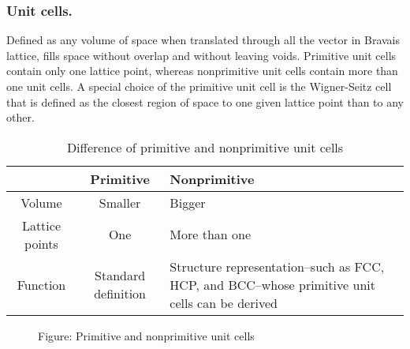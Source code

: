 \documentclass[../../../main.tex]{subfiles}
\begin{document}
\subsubsection{Unit cells.}
Defined as any volume of space when translated through all the vector in Bravais lattice, fills space without overlap and without leaving voids.
Primitive unit cells contain only one lattice point, whereas nonprimitive unit cells contain more than  one unit cells.
A special choice of the primitive unit cell is the
Wigner-Seitz cell that is defined as the closest region of space to one given lattice point than to any other.
\begin{table}[h]
    \centering
    \caption{Difference of primitive and nonprimitive unit cells}
    \begin{tabular}{ cc>{\centering\arraybackslash}p{2cm}} 
        \toprule
        &Primitive&Nonprimitive\\
        \midrule
        Volume&Smaller&Bigger\\
        Lattice points&One&More than one\\
        Function&Standard definition&Structure representation--such as FCC, HCP, and BCC--whose primitive unit cells can be derived\\
        \bottomrule
    \end{tabular}
\end{table}
\begin{figure*}[b]
    \centering
    \caption*{Figure: Primitive and nonprimitive unit cells}
\end{figure*}
\end{document}
